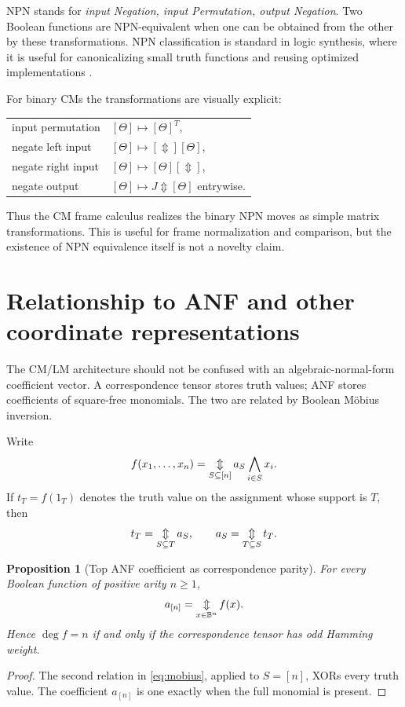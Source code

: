 \documentclass[11pt]{article}
\newtheorem{proposition}[theorem]{Proposition}
\theoremstyle{definition}
\theoremstyle{remark}
\newcommand{\B}{\mathbb B}
\newcommand{\xor}{\mathbin{\Updownarrow}}
\newcommand{\bigxor}{\mathop{\Updownarrow}\displaylimits}
\begin{document}
NPN stands for \emph{input Negation, input Permutation, output Negation}.  Two Boolean functions are NPN-equivalent when one can be obtained from the other by these transformations.  NPN classification is standard in logic synthesis, where it is useful for canonicalizing small truth functions and reusing optimized implementations \cite{Mishchenko2006,Zhou2019}.

For binary CMs the transformations are visually explicit:
\begin{center}
\begin{tabular}{ll}
input permutation & $[\Theta]\mapsto[\Theta]^T$,\\
negate left input & $[\Theta]\mapsto[\Updownarrow][\Theta]$,\\
negate right input & $[\Theta]\mapsto[\Theta][\Updownarrow]$,\\
negate output & $[\Theta]\mapsto J\xor[\Theta]$ entrywise.
\end{tabular}
\end{center}
Thus the CM frame calculus realizes the binary NPN moves as simple matrix transformations.  This is useful for frame normalization and comparison, but the existence of NPN equivalence itself is not a novelty claim.

\section{Relationship to ANF and other coordinate representations}
\label{sec:anf}

The CM/LM architecture should not be confused with an algebraic-normal-form coefficient vector.  A correspondence tensor stores truth values; ANF stores coefficients of square-free monomials.  The two are related by Boolean M\"obius inversion.

Write
\begin{equation}
 f(x_1,\ldots,x_n)
 =\bigxor_{S\subseteq[n]}
 a_S\bigwedge_{i\in S}x_i.
 \label{eq:anf}
\end{equation}
If $t_T=f(1_T)$ denotes the truth value on the assignment whose support is $T$, then
\begin{equation}
 t_T=\bigxor_{S\subseteq T}a_S,
 \qquad
 a_S=\bigxor_{T\subseteq S}t_T.
 \label{eq:mobius}
\end{equation}

\begin{proposition}[Top ANF coefficient as correspondence parity]
For every Boolean function of positive arity $n\ge1$,
\begin{equation}
 a_{[n]}=\bigxor_{x\in\B^n}f(x).
 \label{eq:topparity}
\end{equation}
Hence $\deg f=n$ if and only if the correspondence tensor has odd Hamming weight.
\end{proposition}
\begin{proof}
The second relation in \eqref{eq:mobius}, applied to $S=[n]$, XORs every truth value.  The coefficient $a_{[n]}$ is one exactly when the full monomial is present.
\end{proof}
\end{document}
